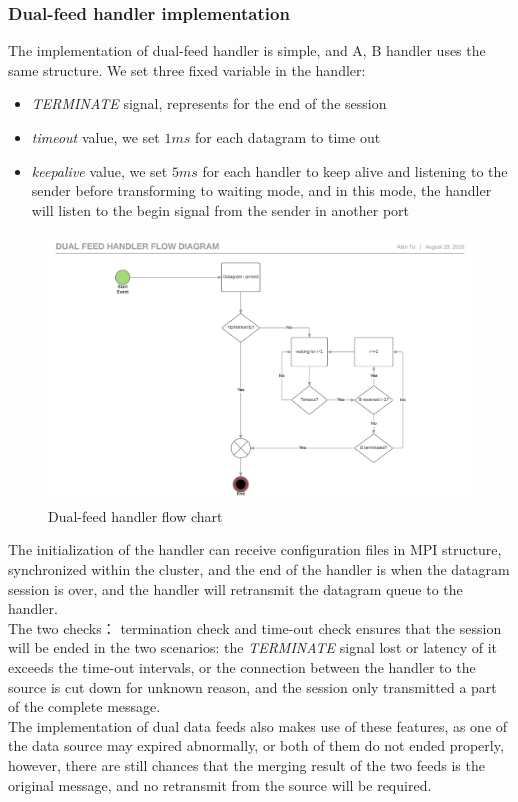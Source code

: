 \documentclass[11pt,openright,a4paper]{report}
\begin{document}
\subsubsection{Dual-feed handler implementation}
The implementation of dual-feed handler is simple, and A, B handler uses the same structure. We set three fixed variable in the handler: 
\begin{itemize}
	\item \textit{TERMINATE} signal, represents for the end of the session
	\item \textit{timeout} value, we set $1ms$ for each datagram to time out
	\item \textit{keepalive} value, we set $5ms$ for each handler to keep alive and listening to the sender before transforming to waiting mode, and in this mode, the handler will listen to the begin signal from the sender in another port
\end{itemize}
\begin{figure}[H]
\centering
\includegraphics[width=0.8\linewidth]{"picture/Dual feed handler flow diagram - Page 1"}
\caption{Dual-feed handler flow chart}
\label{fig:Dualfeedhandlerflowdiagram-Page1}
\end{figure}

The initialization of the handler can receive configuration files in MPI structure, synchronized within the cluster, and the end of the handler is when the datagram session is over, and the handler will retransmit the datagram queue to the handler.\\
The two checks： termination check and time-out check ensures that the session will be ended in the two scenarios: the \textit{TERMINATE} signal lost or latency of it exceeds the time-out intervals, or the connection between the handler to the source is cut down for unknown reason, and the session only transmitted a part of the complete message.\\
The implementation of dual data feeds also makes use of these features, as one of the data source may expired abnormally, or both of them do not ended properly, however, there are still chances that the merging result of the two feeds is the original message, and no retransmit from the source will be required.\\
\end{document}
